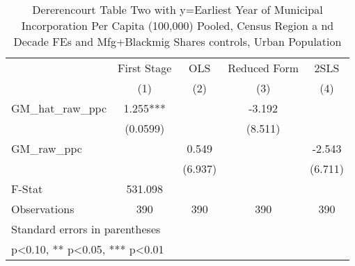 \begin{table}[htbp]\centering
\def\sym#1{\ifmmode^{#1}\else\(^{#1}\)\fi}
\caption{Dererencourt Table Two with y=Earliest Year of Municipal Incorporation Per Capita (100,000) Pooled, Census Region a nd Decade FEs and Mfg+Blackmig Shares controls, Urban Population}
\begin{tabular}{l*{4}{c}}
\toprule
                    & First Stage   &         OLS   &Reduced Form   &        2SLS   \\
                    &\multicolumn{1}{c}{(1)}   &\multicolumn{1}{c}{(2)}   &\multicolumn{1}{c}{(3)}   &\multicolumn{1}{c}{(4)}   \\
\midrule
GM\_hat\_raw\_ppc      &       1.255***&               &      -3.192   &               \\
                    &    (0.0599)   &               &     (8.511)   &               \\
\addlinespace
GM\_raw\_ppc          &               &       0.549   &               &      -2.543   \\
                    &               &     (6.937)   &               &     (6.711)   \\
\midrule
F-Stat              &     531.098   &               &               &               \\
Observations        &         390   &         390   &         390   &         390   \\
\bottomrule
\multicolumn{5}{l}{\footnotesize Standard errors in parentheses}\\
\multicolumn{5}{l}{\footnotesize * p<0.10, ** p<0.05, *** p<0.01}\\
\end{tabular}
\end{table}
